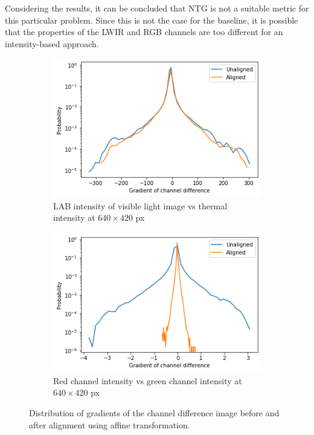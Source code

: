 \documentclass{l4proj}
\begin{document}
Considering the results, it can be concluded that NTG is not a suitable metric for this particular problem. 
Since this is not the case for the baseline, it is possible that the properties of the LWIR and RGB channels are too different for an intensity-based approach.

\begin{figure}[ht]
  \centering
  \begin{subfigure}[h!]{0.45\textwidth}
    \includegraphics[width=\textwidth]{images/registration/gradient_distribution.png}
    \caption{LAB intensity of visible light image vs thermal intensity at $640 \times 420$ px}
    \label{fig:gradient_distribution}
  \end{subfigure}
  \begin{subfigure}[h!]{0.45\textwidth}
    \includegraphics[width=\textwidth]{images/registration/gradient_distribution_red_green.png}
    \caption{Red channel intensity vs green channel intensity at $640 \times 420$ px}
    \label{fig:gradient_distribution_red_green}
  \end{subfigure}
  \caption{Distribution of gradients of the channel difference image before and after alignment using affine transformation.}
\end{figure}
\end{document}
